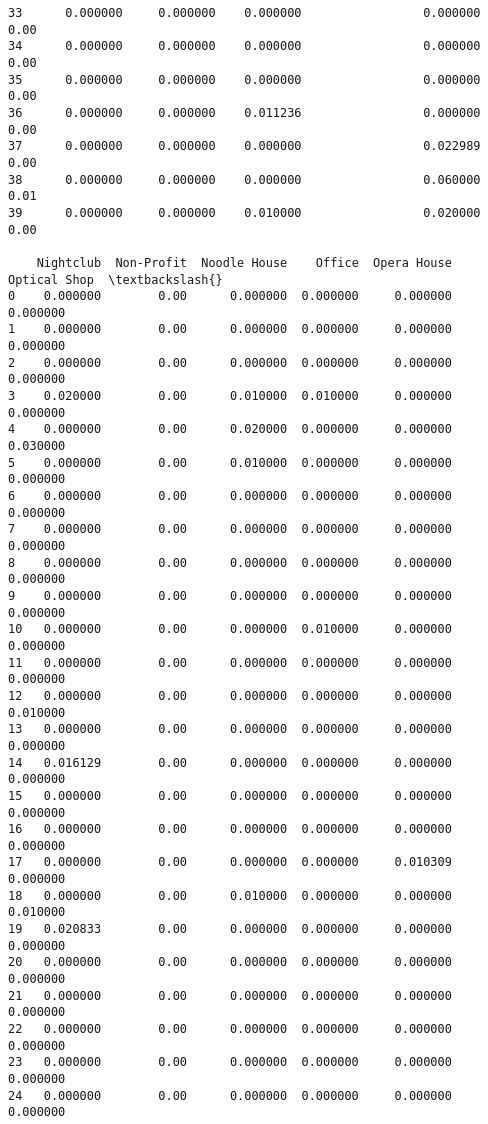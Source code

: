 \documentclass[11pt]{article}
\begin{document}
\begin{tcolorbox}[breakable, size=fbox, boxrule=.5pt, pad at break*=1mm, opacityfill=0]
\begin{Verbatim}[commandchars=\\\{\}]
33      0.000000     0.000000    0.000000                 0.000000       0.00
34      0.000000     0.000000    0.000000                 0.000000       0.00
35      0.000000     0.000000    0.000000                 0.000000       0.00
36      0.000000     0.000000    0.011236                 0.000000       0.00
37      0.000000     0.000000    0.000000                 0.022989       0.00
38      0.000000     0.000000    0.000000                 0.060000       0.01
39      0.000000     0.000000    0.010000                 0.020000       0.00

    Nightclub  Non-Profit  Noodle House    Office  Opera House  Optical Shop  \textbackslash{}
0    0.000000        0.00      0.000000  0.000000     0.000000      0.000000
1    0.000000        0.00      0.000000  0.000000     0.000000      0.000000
2    0.000000        0.00      0.000000  0.000000     0.000000      0.000000
3    0.020000        0.00      0.010000  0.010000     0.000000      0.000000
4    0.000000        0.00      0.020000  0.000000     0.000000      0.030000
5    0.000000        0.00      0.010000  0.000000     0.000000      0.000000
6    0.000000        0.00      0.000000  0.000000     0.000000      0.000000
7    0.000000        0.00      0.000000  0.000000     0.000000      0.000000
8    0.000000        0.00      0.000000  0.000000     0.000000      0.000000
9    0.000000        0.00      0.000000  0.000000     0.000000      0.000000
10   0.000000        0.00      0.000000  0.010000     0.000000      0.000000
11   0.000000        0.00      0.000000  0.000000     0.000000      0.000000
12   0.000000        0.00      0.000000  0.000000     0.000000      0.010000
13   0.000000        0.00      0.000000  0.000000     0.000000      0.000000
14   0.016129        0.00      0.000000  0.000000     0.000000      0.000000
15   0.000000        0.00      0.000000  0.000000     0.000000      0.000000
16   0.000000        0.00      0.000000  0.000000     0.000000      0.000000
17   0.000000        0.00      0.000000  0.000000     0.010309      0.000000
18   0.000000        0.00      0.010000  0.000000     0.000000      0.010000
19   0.020833        0.00      0.000000  0.000000     0.000000      0.000000
20   0.000000        0.00      0.000000  0.000000     0.000000      0.000000
21   0.000000        0.00      0.000000  0.000000     0.000000      0.000000
22   0.000000        0.00      0.000000  0.000000     0.000000      0.000000
23   0.000000        0.00      0.000000  0.000000     0.000000      0.000000
24   0.000000        0.00      0.000000  0.000000     0.000000      0.000000

\end{Verbatim}
\end{tcolorbox}
\end{document}
